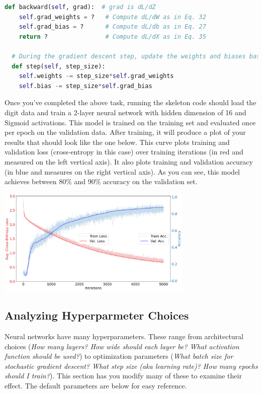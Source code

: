\documentclass[a4paper,10pt]{article}
\begin{document}
\begin{taskbox}
\begin{center}
\begin{minipage}{0.9\textwidth}
\begin{lstlisting}[language=Python]
  def backward(self, grad):  # grad is dL/dZ
    self.grad_weights = ?   # Compute dL/dW as in Eq. 32
    self.grad_bias = ?      # Compute dL/db as in Eq. 27
    return ?                # Compute dL/dX as in Eq. 35
    
  # During the gradient descent step, update the weights and biases based on the stored gradients from the backward pass
  def step(self, step_size):
    self.weights -= step_size*self.grad_weights
    self.bias -= step_size*self.grad_bias
\end{lstlisting}
\end{minipage}
\end{center}

\end{taskbox}



Once you've completed the above task, running the skeleton code should load the digit data and train a 2-layer neural network with hidden dimension of 16 and Sigmoid activations. This model is trained on the training set and evaluated once per epoch on the validation data. After training, it will produce a plot of your results that should look like the one below. This curve plots training and validation loss (cross-entropy in this case) over training iterations (in red and measured on the left vertical axis). It also plots training and validation accuracy (in blue and measures on the right vertical axis). As you can see, this model achieves between 80\% and 90\% accuracy on the validation set.





\begin{center}
\includegraphics[width=0.7\textwidth]{figures/sigmoid.png}
\end{center}


\subsection{Analyzing Hyperparmeter Choices}
Neural networks have many hyperparameters. These range from architectural choices (\emph{How many layers? How wide should each layer be? What activation function should be used?}) to optimization parameters (\emph{What batch size for stochastic gradient descent? What step size (aka learning rate)? How many epochs should I train?}). This section has you modify many of these to examine their effect. The default parameters are below for easy reference.
\end{document}
